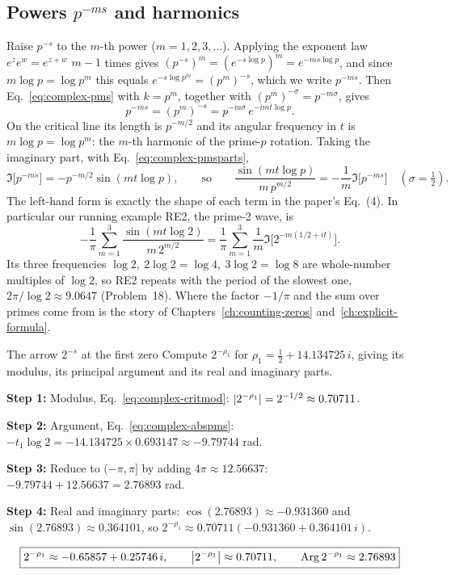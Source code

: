 \subsection{Powers $p^{-ms}$ and harmonics}

Raise $p^{-s}$ to the $m$-th power ($m=1,2,3,\dots$). Applying the exponent law $e^{z}e^{w}=e^{z+w}$ $m-1$ times gives $(p^{-s})^m=(e^{-s\log p})^m=e^{-ms\log p}$, and since $m\log p=\log p^m$ this equals $e^{-s\log p^m}=(p^m)^{-s}$, which we write $p^{-ms}$. Then Eq.~\eqref{eq:complex-pms} with $k=p^m$, together with $(p^m)^{-\sigma}=p^{-m\sigma}$, gives
\begin{equation}
p^{-ms}=(p^m)^{-s}=p^{-m\sigma}\,e^{-imt\log p}.\label{eq:complex-pmms}
\end{equation}
On the critical line its length is $p^{-m/2}$ and its angular frequency in $t$ is $m\log p=\log p^m$: the $m$-th harmonic of the prime-$p$ rotation. Taking the imaginary part, with Eq.~\eqref{eq:complex-pmsparts},
\begin{equation}
\Im\bigl[p^{-ms}\bigr]=-p^{-m/2}\sin(mt\log p),\qquad\text{so}\qquad\frac{\sin(mt\log p)}{m\,p^{m/2}}=-\frac{1}{m}\Im\bigl[p^{-ms}\bigr]\quad(\sigma=\tfrac12).\label{eq:complex-oracleterm}
\end{equation}
The left-hand form is exactly the shape of each term in the paper's Eq.~(4). In particular our running example RE2, the prime-2 wave, is
\begin{equation}
-\frac1\pi\sum_{m=1}^{3}\frac{\sin(mt\log2)}{m\,2^{m/2}}=\frac1\pi\sum_{m=1}^3\frac1m\Im\bigl[2^{-m(1/2+it)}\bigr].\label{eq:complex-re2}
\end{equation}
Its three frequencies $\log2,\ 2\log2=\log4,\ 3\log2=\log8$ are whole-number multiples of $\log 2$, so RE2 repeats with the period of the slowest one, $2\pi/\log2\approx9.0647$ (Problem~18). Where the factor $-1/\pi$ and the sum over primes come from is the story of Chapters~\ref{ch:counting-zeros} and~\ref{ch:explicit-formula}.

\begin{sample}{The arrow $2^{-s}$ at the first zero}
Compute $2^{-\rho_1}$ for $\rho_1=\tfrac12+14.134725\,i$, giving its modulus, its principal argument and its real and imaginary parts.

\textbf{Step 1:} Modulus, Eq.~\eqref{eq:complex-critmod}: $\left\lvert 2^{-\rho_1}\right\rvert=2^{-1/2}\approx0.70711$.

\textbf{Step 2:} Argument, Eq.~\eqref{eq:complex-abspms}: $-t_1\log2=-14.134725\times0.693147\approx-9.79744$ rad.

\textbf{Step 3:} Reduce to $(-\pi,\pi]$ by adding $4\pi\approx12.56637$: $-9.79744+12.56637=2.76893$ rad.

\textbf{Step 4:} Real and imaginary parts: $\cos(2.76893)\approx-0.931360$ and $\sin(2.76893)\approx0.364101$, so $2^{-\rho_1}\approx0.70711(-0.931360+0.364101\,i)$.

\[
\boxed{2^{-\rho_1}\approx-0.65857+0.25746\,i,\qquad\left\lvert 2^{-\rho_1}\right\rvert\approx0.70711,\qquad\operatorname{Arg}2^{-\rho_1}\approx2.76893}
\]
\end{sample}

